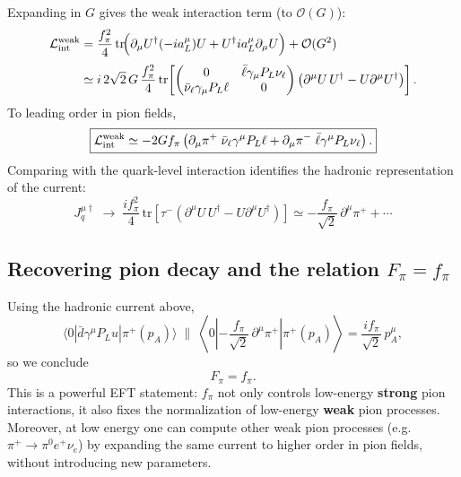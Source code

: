 Expanding in $G$ gives the weak interaction term (to $\mathcal{O}(G)$):
\begin{align}
\mathcal{L}^{\rm weak}_{\rm int}
&=
\frac{f_\pi^2}{4}\,\mathrm{tr}\!\Big(\partial_\mu U^\dagger(-i a_L^\mu)U
+U^\dagger i a_L^\mu \partial_\mu U\Big)+\mathcal{O}(G^2)\\[1mm]
&\simeq
i\,2\sqrt{2}\,G\,\frac{f_\pi^2}{4}\,
\mathrm{tr}\!\left[
\begin{pmatrix}
0 & \bar\ell\gamma_\mu P_L \nu_\ell\\
\bar\nu_\ell\gamma_\mu P_L \ell & 0
\end{pmatrix}
\left(\partial^\mu U\,U^\dagger-U\partial^\mu U^\dagger\right)
\right].
\end{align}
To leading order in pion fields,
\begin{equation}
\boxed{
\mathcal{L}^{\rm weak}_{\rm int}
\simeq
-2G f_\pi\left(
\partial_\mu\pi^+\;\bar\nu_\ell\gamma^\mu P_L \ell
+\partial_\mu\pi^-\;\bar\ell\gamma^\mu P_L \nu_\ell
\right).
}
\end{equation}
Comparing with the quark-level interaction identifies the hadronic representation
of the current:
\begin{equation}
J_q^{\mu\dagger}
\;\to\;
\frac{i f_\pi^2}{4}\,
\mathrm{tr}\!\left[
\tau^-\left(\partial^\mu U\,U^\dagger-U\partial^\mu U^\dagger\right)
\right]
\simeq
-\frac{f_\pi}{\sqrt{2}}\,\partial^\mu \pi^+ + \cdots
\end{equation}

\subsection{Recovering pion decay and the relation $F_\pi=f_\pi$}
Using the hadronic current above,
\begin{equation}
\langle 0|\bar d\gamma^\mu P_L u|\pi^+(p_A)\rangle
\;\parallel\;
\left\langle 0\left|-\frac{f_\pi}{\sqrt2}\,\partial^\mu\pi^+\right|\pi^+(p_A)\right\rangle
=
\frac{i f_\pi}{\sqrt2}\,p_A^\mu,
\end{equation}
so we conclude
\begin{equation}
\boxed{F_\pi=f_\pi.}
\end{equation}
This is a powerful EFT statement: $f_\pi$ not only controls low-energy \textbf{strong} pion interactions,
it also fixes the normalization of low-energy \textbf{weak} pion processes.
Moreover, at low energy one can compute other weak pion processes (e.g.\ $\pi^+\to \pi^0 e^+\nu_e$)
by expanding the same current to higher order in pion fields, without introducing new parameters.

